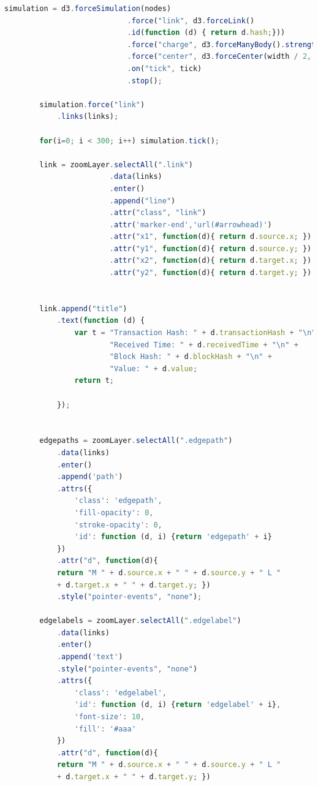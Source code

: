 \begin{itemize}
\begin{lstlisting}[language=Javascript, label=lst:makeGraph, caption={Funzione per grafi.}]
        simulation = d3.forceSimulation(nodes)
                            .force("link", d3.forceLink()
                            .id(function (d) { return d.hash;}))
                            .force("charge", d3.forceManyBody().strength(-80))
                            .force("center", d3.forceCenter(width / 2, height / 2))
                            .on("tick", tick)
                            .stop();

        simulation.force("link")
            .links(links);

        for(i=0; i < 300; i++) simulation.tick();

        link = zoomLayer.selectAll(".link")
                        .data(links)
                        .enter()
                        .append("line")
                        .attr("class", "link")
                        .attr('marker-end','url(#arrowhead)')
                        .attr("x1", function(d){ return d.source.x; })
                        .attr("y1", function(d){ return d.source.y; })
                        .attr("x2", function(d){ return d.target.x; })
                        .attr("y2", function(d){ return d.target.y; })


        link.append("title")
            .text(function (d) {
                var t = "Transaction Hash: " + d.transactionHash + "\n" +
                        "Received Time: " + d.receivedTime + "\n" +
                        "Block Hash: " + d.blockHash + "\n" +
                        "Value: " + d.value;
                return t;

            });


        edgepaths = zoomLayer.selectAll(".edgepath")
            .data(links)
            .enter()
            .append('path')
            .attrs({
                'class': 'edgepath',
                'fill-opacity': 0,
                'stroke-opacity': 0,
                'id': function (d, i) {return 'edgepath' + i}
            })
            .attr("d", function(d){ 
            return "M " + d.source.x + " " + d.source.y + " L " 
            + d.target.x + " " + d.target.y; })
            .style("pointer-events", "none");

        edgelabels = zoomLayer.selectAll(".edgelabel")
            .data(links)
            .enter()
            .append('text')
            .style("pointer-events", "none")
            .attrs({
                'class': 'edgelabel',
                'id': function (d, i) {return 'edgelabel' + i},
                'font-size': 10,
                'fill': '#aaa'
            })
            .attr("d", function(d){ 
            return "M " + d.source.x + " " + d.source.y + " L " 
            + d.target.x + " " + d.target.y; })


\end{lstlisting}
\end{itemize}
